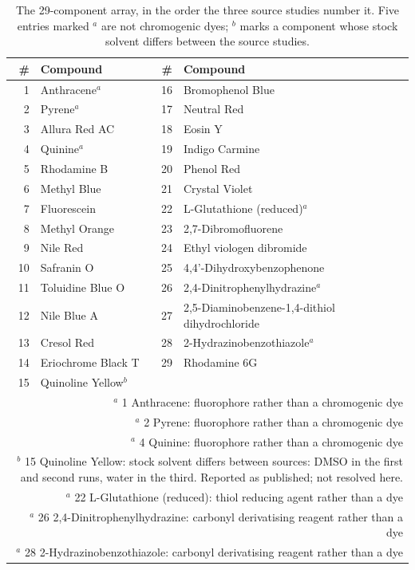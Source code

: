 \begin{table}[htb]
\centering
\caption{The 29-component array, in the order the three source studies number it. Five entries marked $^{a}$ are not chromogenic dyes; $^{b}$ marks a component whose stock solvent differs between the source studies.}
\label{tab:dyepanel}
\small
\begin{tabular}{rlrl}
\hline
\# & Compound & \# & Compound \\
\hline
1 & Anthracene$^{a}$ & 16 & Bromophenol Blue \\
2 & Pyrene$^{a}$ & 17 & Neutral Red \\
3 & Allura Red AC & 18 & Eosin Y \\
4 & Quinine$^{a}$ & 19 & Indigo Carmine \\
5 & Rhodamine B & 20 & Phenol Red \\
6 & Methyl Blue & 21 & Crystal Violet \\
7 & Fluorescein & 22 & L-Glutathione (reduced)$^{a}$ \\
8 & Methyl Orange & 23 & 2,7-Dibromofluorene \\
9 & Nile Red & 24 & Ethyl viologen dibromide \\
10 & Safranin O & 25 & 4,4'-Dihydroxybenzophenone \\
11 & Toluidine Blue O & 26 & 2,4-Dinitrophenylhydrazine$^{a}$ \\
12 & Nile Blue A & 27 & 2,5-Diaminobenzene-1,4-dithiol dihydrochloride \\
13 & Cresol Red & 28 & 2-Hydrazinobenzothiazole$^{a}$ \\
14 & Eriochrome Black T & 29 & Rhodamine 6G \\
15 & Quinoline Yellow$^{b}$ &  &  \\
\hline
\multicolumn{4}{p{13cm}}{\footnotesize $^{a}$ 1 Anthracene: fluorophore rather than a chromogenic dye}\\
\multicolumn{4}{p{13cm}}{\footnotesize $^{a}$ 2 Pyrene: fluorophore rather than a chromogenic dye}\\
\multicolumn{4}{p{13cm}}{\footnotesize $^{a}$ 4 Quinine: fluorophore rather than a chromogenic dye}\\
\multicolumn{4}{p{13cm}}{\footnotesize $^{b}$ 15 Quinoline Yellow: stock solvent differs between sources: DMSO in the first and second runs, water in the third. Reported as published; not resolved here.}\\
\multicolumn{4}{p{13cm}}{\footnotesize $^{a}$ 22 L-Glutathione (reduced): thiol reducing agent rather than a dye}\\
\multicolumn{4}{p{13cm}}{\footnotesize $^{a}$ 26 2,4-Dinitrophenylhydrazine: carbonyl derivatising reagent rather than a dye}\\
\multicolumn{4}{p{13cm}}{\footnotesize $^{a}$ 28 2-Hydrazinobenzothiazole: carbonyl derivatising reagent rather than a dye}\\
\end{tabular}
\end{table}
